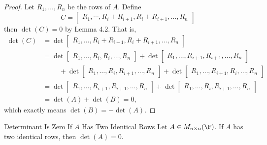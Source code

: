 \documentclass[linearalgebra]{subfiles}
\begin{document}
    \begin{proof}
        Let $R_1, \ldots, R_n$ be the rows of $A$. Define
        \begin{equation*}
            C =
            \begin{bmatrix}
                R_1, \cdots, R_i+R_{i+1}, R_i+R_{i+1}, \ldots, R_n
            \end{bmatrix}
        \end{equation*}
        then $\det(C) = 0$ by Lemma 4.2. That is,
        \begin{align*}
            \det(C) & = \det 
            \begin{bmatrix}
                R_1, \ldots, R_i+R_{i+1}, R_i+R_{i+1}, \ldots, R_n
            \end{bmatrix} \\
                    & = \det 
            \begin{bmatrix}
                R_1, \ldots, R_i, R_i, \ldots, R_n
            \end{bmatrix}
            + \det 
            \begin{bmatrix}
                R_1, \ldots, R_{i+1}, R_{i+1}, \ldots, R_n
            \end{bmatrix} \\
                    & \hspace{1cm} + \det 
            \begin{bmatrix}
                R_1, \ldots, R_i, R_{i+1}, \ldots, R_n    
            \end{bmatrix}
            + \det 
            \begin{bmatrix}
                R_1, \ldots, R_{i+1}, R_i, \ldots, R_n
            \end{bmatrix} \\
            & = \det
            \begin{bmatrix}
                R_1, \ldots, R_{i+1}, R_{i+1}, \ldots, R_n
            \end{bmatrix} 
            + \det
            \begin{bmatrix}
                R_1, \ldots, R_i, R_{i+1}, \ldots, R_n    
            \end{bmatrix} \\
            & = 
            \det(A) + \det(B) = 0,
        \end{align*} 
        which exactly means $\det(B) = -\det(A)$.
    \end{proof}

    \begin{lemma}{Determinant Is Zero If $A$ Has Two Identical Rows}
        Let $A\in M_{n\times n}(\F)$. If $A$ has two identical rows, then $\det(A) = 0$.
    \end{lemma}
\end{document}
